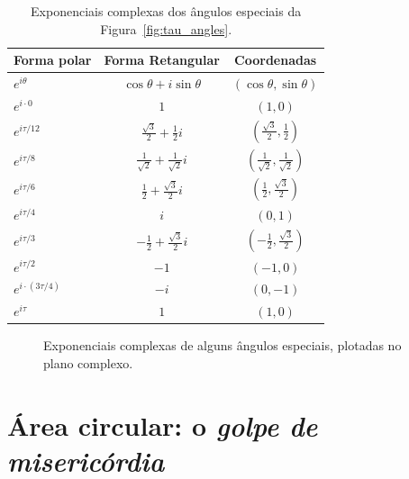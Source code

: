 {\begin{table}
\begin{center}
\begin{tabular}{lcc}
Forma polar & Forma Retangular & Coordenadas \\ \hline\hline
$e^{i\theta}$ & $\cos\theta + i\sin\theta$ & $(\cos\theta, \sin\theta)$ \\ \hline
$e^{i\cdot0}$ & $1$ & $(1, 0)$ \smallskip \\
$e^{i\tau/12}$ & $\frac{\sqrt{3}}{2} + \frac{1}{2}i$ & $(\frac{\sqrt{3}}{2}, \frac{1}{2})$ \smallskip \\
$e^{i\tau/8}$ & $\frac{1}{\sqrt{2}} +  \frac{1}{\sqrt{2}}i$ & $(\frac{1}{\sqrt{2}}, \frac{1}{\sqrt{2}})$ \smallskip \\
$e^{i\tau/6}$ & $\frac{1}{2} +\frac{\sqrt{3}}{2} i$ & $(\frac{1}{2}, \frac{\sqrt{3}}{2})$ \smallskip \\
$e^{i\tau/4}$ & $i$ & $(0, 1)$ \smallskip \\
$e^{i\tau/3}$ & $-\frac{1}{2} +\frac{\sqrt{3}}{2} i$ & $(-\frac{1}{2}, \frac{\sqrt{3}}{2})$ \smallskip \\
$e^{i\tau/2}$ & $-1$ & $(-1, 0)$ \smallskip \\
$e^{i\cdot(3\tau/4)}$ & $-i$ & $(0, -1)$ \smallskip \\
$e^{i\tau}$ & $1$ & $(1, 0)$
\end{tabular}
\end{center}
\caption{Exponenciais complexas dos ângulos especiais da Figura~\ref{fig:tau_angles}.\label{table:complex_exponentials}}
\end{table}

\begin{figure}
\begin{center}
\end{center}
\caption{Exponenciais complexas de alguns ângulos especiais, plotadas no plano complexo.\label{fig:tau_euler_circle}}
\end{figure}


\section{Área circular: o \emph{golpe de misericórdia}} %
\label{sec:circular_area}

}
